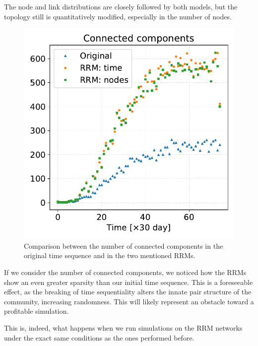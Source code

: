 \documentclass[a4paper,11pt, twocolumn]{article}
\begin{document}
The node and link distributions are closely followed by both models, but the topology still is quantitatively modified, especially in the number of nodes.
\begin{figure}[htp]
\centering
\includegraphics[scale=0.3]{./Figure/Simulations/connected_components.pdf}
\caption{Comparison between the number of connected components in the original time sequence and in the two mentioned RRMs.}
\end{figure}

If we consider the number of connected components, we noticed how the RRMs show an even greater sparsity than our initial time sequence. This is a foreseeable effect, as the breaking of time sequentiality alters the innate pair structure of the community, increasing randomness. This will likely represent an obstacle toward a profitable simulation.

This is, indeed, what happens when we run simulations on the RRM networks under the exact same conditions as the ones performed before.
\end{document}
